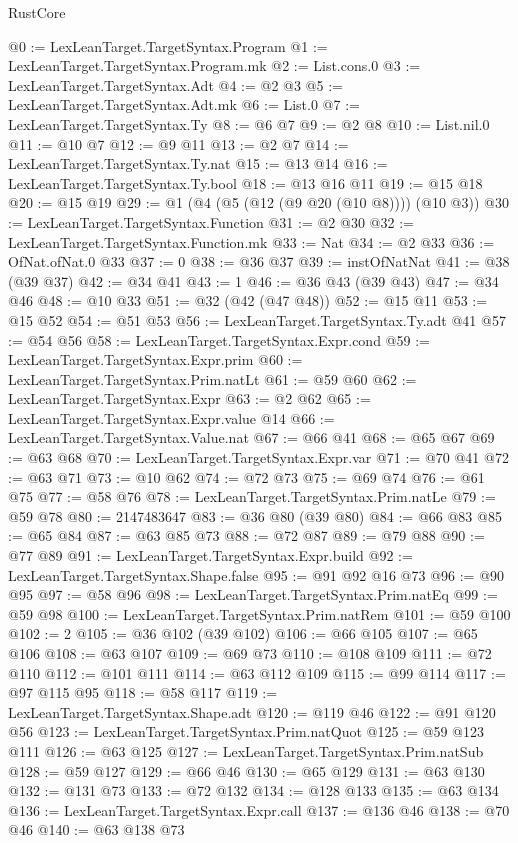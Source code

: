 \begin{lexlean}{RustCore}
\begin{coremodule}
@0 := LexLeanTarget.TargetSyntax.Program
@1 := LexLeanTarget.TargetSyntax.Program.mk
@2 := List.cons.{0}
@3 := LexLeanTarget.TargetSyntax.Adt
@4 := @2 @3
@5 := LexLeanTarget.TargetSyntax.Adt.mk
@6 := List.{0}
@7 := LexLeanTarget.TargetSyntax.Ty
@8 := @6 @7
@9 := @2 @8
@10 := List.nil.{0}
@11 := @10 @7
@12 := @9 @11
@13 := @2 @7
@14 := LexLeanTarget.TargetSyntax.Ty.nat
@15 := @13 @14
@16 := LexLeanTarget.TargetSyntax.Ty.bool
@18 := @13 @16 @11
@19 := @15 @18
@20 := @15 @19
@29 := @1 (@4 (@5 (@12 (@9 @20 (@10 @8)))) (@10 @3))
@30 := LexLeanTarget.TargetSyntax.Function
@31 := @2 @30
@32 := LexLeanTarget.TargetSyntax.Function.mk
@33 := Nat
@34 := @2 @33
@36 := OfNat.ofNat.{0} @33
@37 := 0
@38 := @36 @37
@39 := instOfNatNat
@41 := @38 (@39 @37)
@42 := @34 @41
@43 := 1
@46 := @36 @43 (@39 @43)
@47 := @34 @46
@48 := @10 @33
@51 := @32 (@42 (@47 @48))
@52 := @15 @11
@53 := @15 @52
@54 := @51 @53
@56 := LexLeanTarget.TargetSyntax.Ty.adt @41
@57 := @54 @56
@58 := LexLeanTarget.TargetSyntax.Expr.cond
@59 := LexLeanTarget.TargetSyntax.Expr.prim
@60 := LexLeanTarget.TargetSyntax.Prim.natLt
@61 := @59 @60
@62 := LexLeanTarget.TargetSyntax.Expr
@63 := @2 @62
@65 := LexLeanTarget.TargetSyntax.Expr.value @14
@66 := LexLeanTarget.TargetSyntax.Value.nat
@67 := @66 @41
@68 := @65 @67
@69 := @63 @68
@70 := LexLeanTarget.TargetSyntax.Expr.var
@71 := @70 @41
@72 := @63 @71
@73 := @10 @62
@74 := @72 @73
@75 := @69 @74
@76 := @61 @75
@77 := @58 @76
@78 := LexLeanTarget.TargetSyntax.Prim.natLe
@79 := @59 @78
@80 := 2147483647
@83 := @36 @80 (@39 @80)
@84 := @66 @83
@85 := @65 @84
@87 := @63 @85 @73
@88 := @72 @87
@89 := @79 @88
@90 := @77 @89
@91 := LexLeanTarget.TargetSyntax.Expr.build
@92 := LexLeanTarget.TargetSyntax.Shape.false
@95 := @91 @92 @16 @73
@96 := @90 @95
@97 := @58 @96
@98 := LexLeanTarget.TargetSyntax.Prim.natEq
@99 := @59 @98
@100 := LexLeanTarget.TargetSyntax.Prim.natRem
@101 := @59 @100
@102 := 2
@105 := @36 @102 (@39 @102)
@106 := @66 @105
@107 := @65 @106
@108 := @63 @107
@109 := @69 @73
@110 := @108 @109
@111 := @72 @110
@112 := @101 @111
@114 := @63 @112 @109
@115 := @99 @114
@117 := @97 @115 @95
@118 := @58 @117
@119 := LexLeanTarget.TargetSyntax.Shape.adt
@120 := @119 @46
@122 := @91 @120 @56
@123 := LexLeanTarget.TargetSyntax.Prim.natQuot
@125 := @59 @123 @111
@126 := @63 @125
@127 := LexLeanTarget.TargetSyntax.Prim.natSub
@128 := @59 @127
@129 := @66 @46
@130 := @65 @129
@131 := @63 @130
@132 := @131 @73
@133 := @72 @132
@134 := @128 @133
@135 := @63 @134
@136 := LexLeanTarget.TargetSyntax.Expr.call
@137 := @136 @46
@138 := @70 @46
@140 := @63 @138 @73

\end{coremodule}
\end{lexlean}
